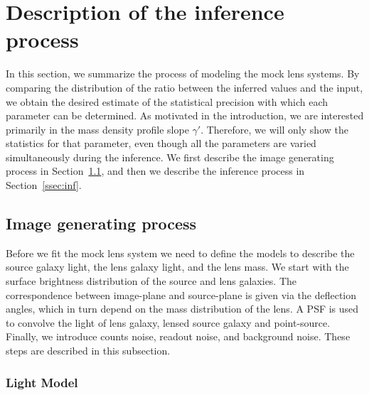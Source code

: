\documentclass[a4paper,11pt]{article}
\begin{document}
\section{Description of the inference process}


In this section, we summarize the process of modeling the mock lens
systems. By comparing the distribution of the ratio between the
inferred values and the input, we obtain the desired estimate of the
statistical precision with which each parameter can be determined. As
motivated in the introduction, we are interested primarily in the mass
density profile slope $\gamma'$. Therefore, we will only show the
statistics for that parameter, even though all the parameters are
varied simultaneously during the inference. We first describe the
image generating process in Section~\ref{ssec:image}, and then we
describe the inference process in Section~\ref{ssec:inf}.

\subsection{Image generating process}
\label{ssec:image}

Before we fit the mock lens system we need to define the models to
describe the source galaxy light, the lens galaxy light, and the lens
mass. We start with the surface brightness distribution of the
source and lens galaxies. The correspondence between image-plane and source-plane
 is given via the deflection angles, which in turn depend on the mass distribution of the lens.
 A PSF is used to convolve the light of lens galaxy, lensed source galaxy and point-source.
 Finally, we introduce counts noise, readout noise, and background noise.
 These steps are described in this subsection.

\subsubsection{Light Model}
\end{document}
